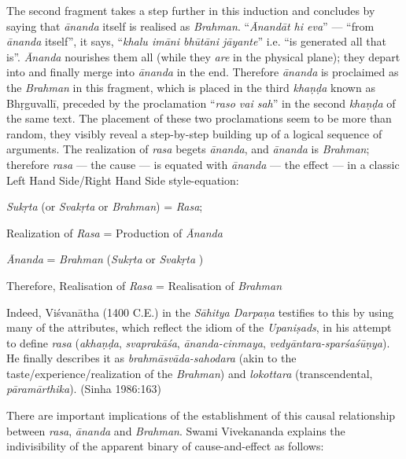 The second fragment takes a step further in this induction and concludes by saying that \textsl{ānanda} itself is realised as \textsl{Brahman}. “\textsl{Ānandāt hi eva}” --- “from \textsl{ānanda} itself”, it says, “\textsl{khalu imāni bhūtāni jāyante}” i.e. “is generated all that is”. \textsl{Ānanda} nourishes them all (while they \textsl{are} in the physical plane); they depart into and finally merge into \textsl{ānanda} in the end. Therefore \textsl{ānanda} is proclaimed as the \textsl{Brahman} in this fragment, which is placed in the third \textsl{khaṇḍa} known as Bhṛguvallī, preceded by the proclamation “\textsl{raso vai sah}” in the second \textsl{khaṇḍa} of the same text. The placement of these two proclamations seem to be more than random, they visibly reveal a step-by-step building up of a logical sequence of arguments. The realization of \textsl{rasa} begets \textsl{ānanda}, and \textsl{ānanda} is \textsl{Brahman}; therefore \textsl{rasa} --- the cause --- is equated with \textsl{ānanda} --- the effect --- in a classic Left Hand Side/Right Hand Side style-equation: 

\textsl{Sukṛta} (or \textsl{Svakṛta} or \textsl{Brahman}) = \textsl{Rasa};

Realization of \textsl{Rasa} = Production of \textsl{Ānanda}

\textsl{Ānanda} = \textsl{Brahman} (\textsl{Sukṛta} or \textsl{Svakṛta} )

Therefore, Realisation of \textsl{Rasa} = Realisation of \textsl{Brahman}

Indeed, Viśvanātha (1400 C.E.) in the \textsl{Sāhitya Darpaṇa} testifies to this by using many of the attributes, which reflect the idiom of the \textsl{Upaniṣads}, in his attempt to define \textsl{rasa} (\textsl{akhaṇḍa}, \textsl{svaprakāśa}, \textsl{ānanda-cinmaya}, \textsl{vedyāntara-sparśaśūṇya}). He finally describes it as \textsl{brahmāsvāda-sahodara} (akin to the taste/experience/realization of the \textsl{Brahman}) and \textsl{lokottara} (transcendental, \textsl{pāramārthika}). (Sinha 1986:163)

There are important implications of the establishment of this causal relationship between \textsl{rasa}, \textsl{ānanda} and \textsl{Brahman}. Swami Vivekananda explains the indivisibility of the apparent binary of cause-and-effect as follows: 

